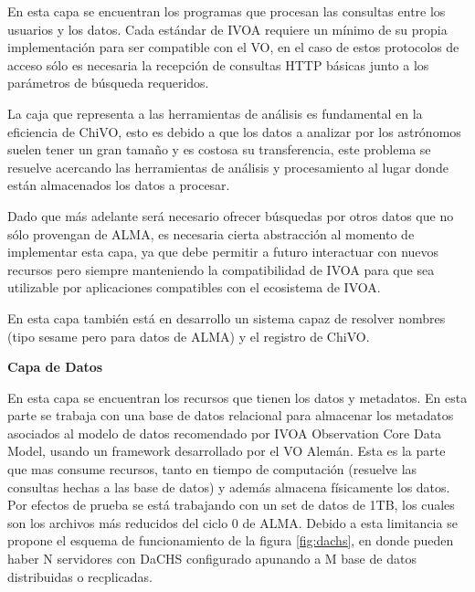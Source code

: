 En esta capa se encuentran los programas que procesan las consultas entre los
usuarios y los datos.
Cada estándar de IVOA requiere un mínimo de su propia implementación para ser
compatible con el VO, en el caso de estos protocolos de acceso sólo es necesaria la
recepción de consultas HTTP básicas junto a los parámetros de búsqueda requeridos.

La caja que representa a las herramientas de análisis es fundamental en la
eficiencia de ChiVO, esto es debido a que los datos a analizar por los astrónomos
suelen tener un gran tamaño y es costosa su transferencia, este problema se
resuelve acercando las herramientas de análisis y procesamiento al lugar donde están
almacenados los datos a procesar.

Dado que más adelante será necesario ofrecer búsquedas por otros datos que no sólo
provengan de ALMA, es necesaria cierta abstracción al momento de implementar esta
capa, ya que debe permitir a futuro interactuar con nuevos recursos pero siempre
manteniendo la compatibilidad de IVOA para que sea utilizable por aplicaciones
compatibles con el ecosistema de IVOA.

En esta capa también está en desarrollo un sistema capaz de resolver nombres
(tipo sesame pero para datos de ALMA) y el registro de ChiVO.

\textbf{Capa de Datos}

En esta capa se encuentran los recursos que tienen los datos y metadatos.
En esta parte se trabaja con una base de datos relacional para almacenar los
metadatos asociados al modelo de datos recomendado por IVOA Observation Core Data
Model, usando un framework desarrollado por el VO Alemán.
Esta es la parte que mas consume recursos, tanto en tiempo de computación (resuelve
las consultas hechas a las base de datos) y además almacena físicamente los datos.
Por efectos de prueba se está trabajando con un set de datos de 1TB, los cuales son
los archivos más reducidos del ciclo 0 de ALMA. Debido a esta limitancia se propone
el esquema de funcionamiento de la figura \ref{fig:dachs}, en donde pueden haber N 
servidores con DaCHS configurado apunando a M base de datos distribuidas o recplicadas.

